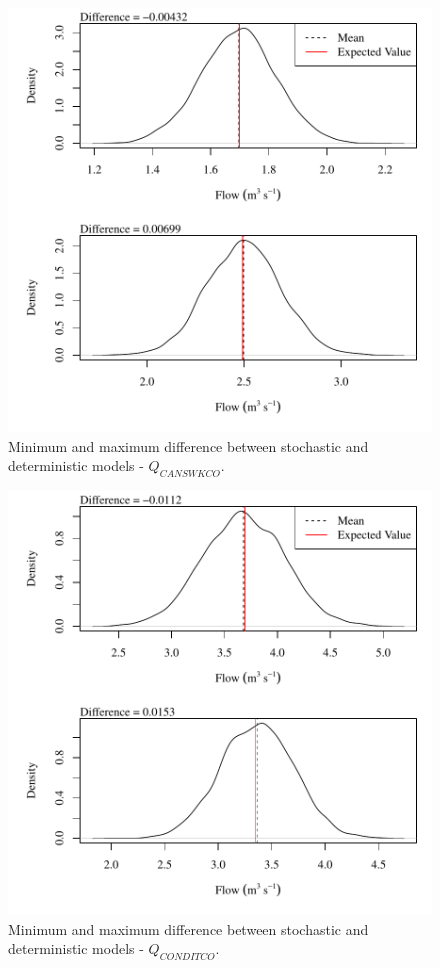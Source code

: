 \begin{center}
\begin{figure}[htbp]
	\includegraphics[width=6in]{"Figures/Results_USR/V min-max diff qCAN"}
	\caption{Minimum and maximum difference between stochastic and deterministic models - $Q_{CANSWKCO}$.}
\end{figure}
\end{center}
\newpage

\begin{center}
\begin{figure}[htbp]
	\includegraphics[width=6in]{"Figures/Results_USR/V min-max diff qCON"}
	\caption{Minimum and maximum difference between stochastic and deterministic models - $Q_{CONDITCO}$.}
\end{figure}
\end{center}
\newpage

